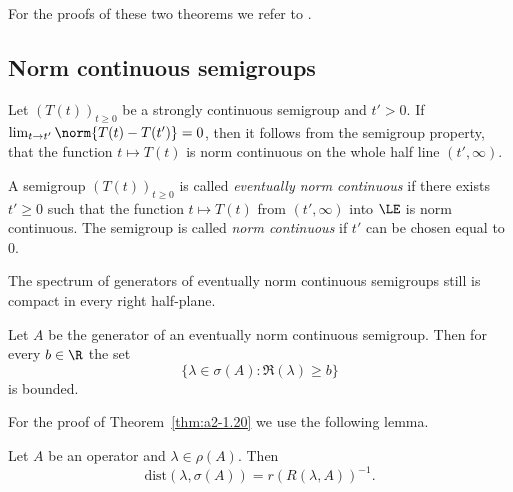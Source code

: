 For the proofs of these two theorems we refer to \textcite[Chapter 3, Theorem 4.7 and 4.8]{pazy:1983}.

\subsection{Norm continuous semigroups} \label{subsec:a2-1.se6}%
Let $(T(t))_{t\geq 0}$ be a strongly continuous semigroup and $t' > 0$.
If\/ $\lim_{t \to t'} \norm{T(t) - T(t')} = 0$, then it follows from the semigroup property, that the function $t \mapsto T(t)$ is norm continuous on the whole half line $(t',\infty)$.

\begin{definition}\label{def:a2-1.19}
A semigroup $(T(t))_{t\geq 0}$ is called \emph{eventually norm continuous} if there exists $t' \geq 0$ such that the function $t \mapsto T(t)$ from $(t',\infty)$ into $\LE$ is norm continuous.
The semigroup is called \emph{norm continuous} if\/ $t'$ can be chosen equal to $0$.
\end{definition}

The spectrum of generators of eventually norm continuous semigroups still is compact in every right half-plane.

\begin{theorem}\label{thm:a2-1.20}
Let $A$ be the generator of an eventually norm continuous semigroup.
Then for every $b \in \R$ the set
\[
    \{\lambda \in \sigma(A) \colon \Re(\lambda) \geq b\}
\]
is bounded.
\end{theorem}
For the proof of Theorem~\ref{thm:a2-1.20} we use the following lemma.
\begin{lemma}\label{lem:a2-1.21}
Let $A$ be an operator and $\lambda \in \rho(A)$.
Then
\[
    \text{dist}(\lambda,\sigma(A)) = r(R(\lambda,A))^{-1}.
\]
\end{lemma}

